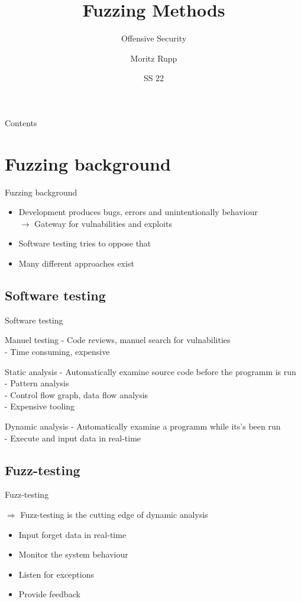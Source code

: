 \documentclass{beamer}
\title[Offensive Security]{Fuzzing Methods}
\subtitle{Offensive Security}
\author{Moritz Rupp}
\institute[MR]{Hochschule Albstadt-Sigmaringen}
\date{SS 22}
\begin{document}
\begin{frame}
 \titlepage
\end{frame}
\begin{frame}{Contents}
 \tableofcontents
\end{frame}
\section{Fuzzing background}
\begin{frame}{Fuzzing background}
\begin{itemize}
 \item Development produces bugs, errors and unintentionally behaviour\\
 $\rightarrow$ Gateway for vulnabilities and exploits
 \item Software testing tries to oppose that
 \item Many different approaches exist
\end{itemize}
\end{frame}
\subsection{Software testing}
\begin{frame}{Software testing}
 \begin{block}{Manuel testing}
  - Code reviews, manuel search for vulnabilities\\
  - Time consuming, expensive
 \end{block}
\begin{block}{Static analysis}
- Automatically examine source code before the programm is run\\
- Pattern analysis \\
- Control flow graph, data flow analysis\\
- Expensive tooling
\end{block}
\begin{block}{Dynamic analysis}
- Automatically examine a programm while its's been run\\
- Execute and input data in real-time\\
\end{block}
\end{frame}
\subsection{Fuzz-testing}
\begin{frame}{Fuzz-testing}

  $\Rightarrow$ Fuzz-testing is the cutting edge of dynamic analysis
  
  \begin{itemize}
   \item Input forget data in real-time
   \item Monitor the system behaviour
   \item Listen for exceptions
   \item Provide feedback
  \end{itemize}

\end{frame}
\end{document}
